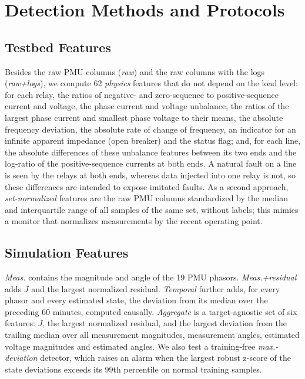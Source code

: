 \documentclass[conference]{IEEEtran}
\begin{document}
\section{Detection Methods and Protocols}
\subsection{Testbed Features}
Besides the raw PMU columns (\emph{raw}) and the raw columns with the logs (\emph{raw+logs}), we compute 62 \emph{physics} features that do not depend on the load level: for each relay, the ratios of negative- and zero-sequence to positive-sequence current and voltage, the phase current and voltage unbalance, the ratios of the largest phase current and smallest phase voltage to their means, the absolute frequency deviation, the absolute rate of change of frequency, an indicator for an infinite apparent impedance (open breaker) and the status flag; and, for each line, the absolute differences of these unbalance features between its two ends and the log-ratio of the positive-sequence currents at both ends. A natural fault on a line is seen by the relays at both ends, whereas data injected into one relay is not, so these differences are intended to expose imitated faults. As a second approach, \emph{set-normalized} features are the raw PMU columns standardized by the median and interquartile range of all samples of the same set, without labels; this mimics a monitor that normalizes measurements by the recent operating point.

\subsection{Simulation Features}
\emph{Meas.} contains the magnitude and angle of the 19 PMU phasors. \emph{Meas.+residual} adds $J$ and the largest normalized residual. \emph{Temporal} further adds, for every phasor and every estimated state, the deviation from its median over the preceding 60 minutes, computed causally. \emph{Aggregate} is a target-agnostic set of six features: $J$, the largest normalized residual, and the largest deviation from the trailing median over all measurement magnitudes, measurement angles, estimated voltage magnitudes and estimated angles. We also test a training-free \emph{max.-deviation} detector, which raises an alarm when the largest robust z-score of the state deviations exceeds its 99th percentile on normal training samples.
\end{document}
